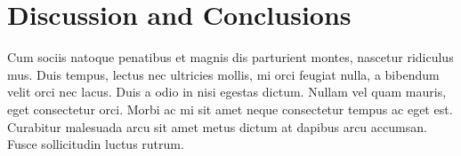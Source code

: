 \documentclass[usenatbib]{mnras}
\begin{document}
\section{Discussion and Conclusions}
\label{sec:conclusions}
Cum sociis natoque penatibus et magnis dis parturient montes, nascetur
ridiculus mus. Duis tempus, lectus nec ultricies mollis, mi orci
feugiat nulla, a bibendum velit orci nec lacus. Duis a odio in nisi
egestas dictum. Nullam vel quam mauris, eget consectetur orci. Morbi
ac mi sit amet neque consectetur tempus ac eget est. Curabitur
malesuada arcu sit amet metus dictum at dapibus arcu accumsan. Fusce
sollicitudin luctus rutrum.
\end{document}
